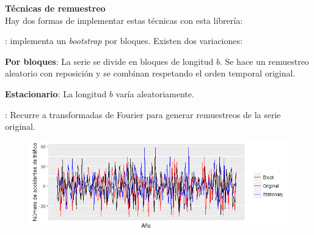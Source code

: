 \documentclass[10pt,a4paper,twoside]{beamer}
\begin{document}
\begin{frame}
\textbf{Técnicas de remuestreo}\\
Hay dos formas de implementar estas técnicas con esta librería:
\begin{itemize*}
\item \textbf{}: implementa un \textit{bootstrap} por bloques. Existen dos variaciones:
    \begin{itemize*}
    \item \textbf{Por bloques}: La serie se divide en bloques de longitud $b$. Se hace un remuestreo aleatorio con reposición y se combinan respetando el orden temporal original.
    \item \textbf{Estacionario}: La longitud $b$ varía aleatoriamente.
    \end{itemize*}
\item \textbf{}: Recurre a transformadas de Fourier para generar remuestreos de la serie original.
\end{itemize*}

\begin{figure}
    \centering
    \centerline{\includegraphics[scale = 0.6]{Images/32413242.png}}
\end{figure}

\end{frame}

\end{document}
